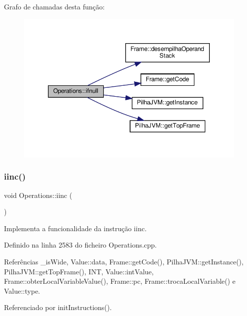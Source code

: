 Grafo de chamadas desta função\+:
\nopagebreak
\begin{figure}[H]
\begin{center}
\leavevmode
\includegraphics[width=343pt]{classOperations_a030f5995f8f357254e543d0cbce2d189_cgraph}
\end{center}
\end{figure}
\mbox{\label{classOperations_a9934f9369192b10a978c7d6950592c42}} 
\subsubsection{\texorpdfstring{iinc()}{iinc()}}
{\footnotesize\ttfamily void Operations\+::iinc (\begin{DoxyParamCaption}{ }\end{DoxyParamCaption})\hspace{0.3cm}{\ttfamily [private]}}



Implementa a funcionalidade da instrução iinc. 



Definido na linha 2583 do ficheiro Operations.\+cpp.



Referências \+\_\+is\+Wide, Value\+::data, Frame\+::get\+Code(), Pilha\+J\+V\+M\+::get\+Instance(), Pilha\+J\+V\+M\+::get\+Top\+Frame(), I\+NT, Value\+::int\+Value, Frame\+::obter\+Local\+Variable\+Value(), Frame\+::pc, Frame\+::troca\+Local\+Variable() e Value\+::type.



Referenciado por init\+Instructions().

